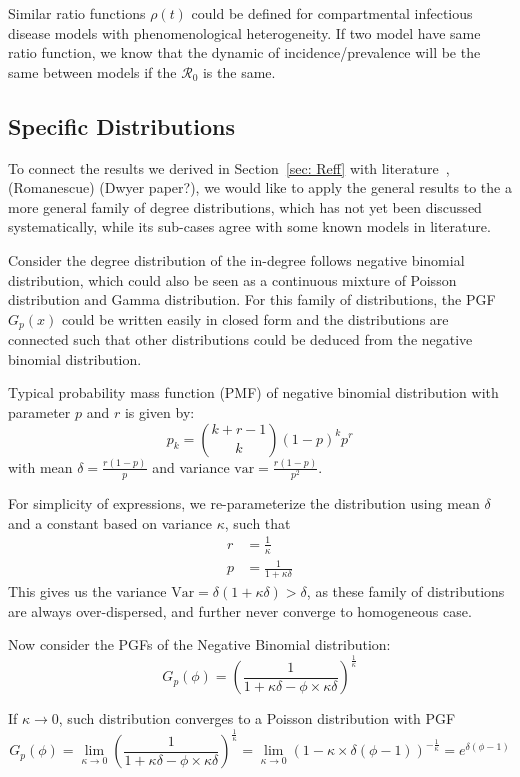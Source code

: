 \documentclass[12pt]{article}
\theoremstyle{plain}
\theoremstyle{definition}
\begin{document}
Similar ratio functions $\rho(t)$ could be defined for compartmental infectious disease models with phenomenological heterogeneity.
If two model have same ratio function, we know that the dynamic of incidence/prevalence will be the same between models if the $\mathcal{R}_0$ is the same.

\subsection{Specific Distributions}
To connect the results we derived in Section~\ref{sec: Reff} with literature~\cite{Novozhilov:2008}, (Romanescue)
(Dwyer paper?), we would like to apply the general results to the a more general family of degree distributions, which has not yet been discussed systematically, while its sub-cases agree with some known models in literature.

Consider the degree distribution of the in-degree follows  negative binomial distribution, which could also be seen as a continuous mixture of Poisson distribution and Gamma distribution.
For this family of distributions, the PGF $G_p(x)$ could be written easily in closed form and the distributions are connected such that other distributions could be deduced from the negative binomial distribution.

Typical probability mass function (PMF) of negative binomial distribution with parameter $p$ and $r$ is given by:
\begin{equation}
	p_k=\binom{k+r-1}{k}(1-p)^k p^r
\end{equation} 
with mean $\delta=\frac{r(1-p)}{p}$ and variance $\text{var}=\frac{r(1-p)}{p^2}$.

For simplicity of expressions, we re-parameterize the distribution using mean $\delta$ and a constant based on variance $\kappa$, such that 
\begin{align} 
	r & =\frac{1}{\kappa}
	\\
	p & =\frac{1}{1+\kappa\delta}
\end{align}
This gives us the variance $\text{Var}=\delta(1+\kappa\delta)>\delta$, as these family of distributions are always over-dispersed, and further never converge to homogeneous case.

Now consider the PGFs of the Negative Binomial distribution:
\begin{equation}
	G_p(\phi)=(\frac{1}{1+\kappa\delta-\phi\times\kappa\delta})^{\frac{1}{\kappa}}
\end{equation}

If $\kappa \rightarrow 0$, such distribution converges to a Poisson distribution with PGF
\begin{equation}
G_p(\phi)=\lim_{\kappa\rightarrow 0} (\frac{1}{1+\kappa\delta-\phi\times\kappa\delta})^{\frac{1}{\kappa}}=\lim_{\kappa\rightarrow 0} (1-\kappa \times\delta(\phi-1))^{-\frac{1}{\kappa}}=e^{\delta(\phi-1)}
\end{equation}
\end{document}

